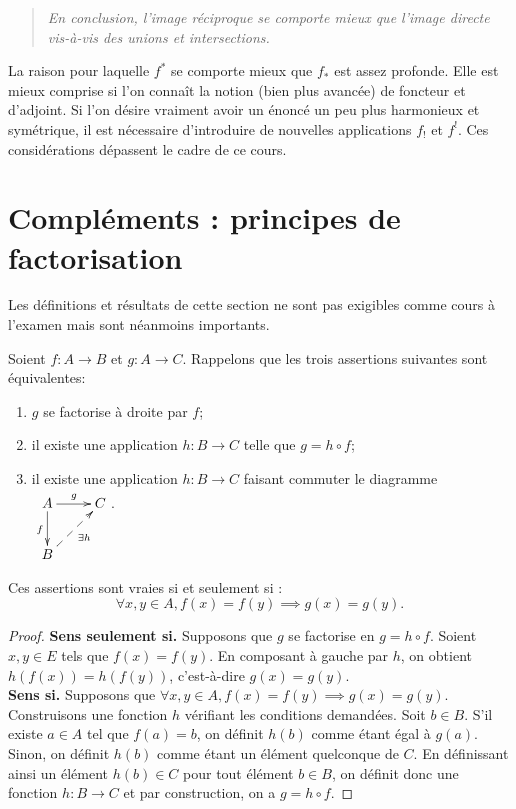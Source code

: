 \begin{quote}
\emph{En conclusion, l'image réciproque se comporte mieux que l'image directe vis-à-vis des unions et intersections.}
\end{quote}

\begin{remarque}
La raison pour laquelle $f^*$ se comporte mieux que $f_*$ est assez profonde. Elle est mieux comprise si l'on connaît la notion (bien plus avancée) de foncteur et d'adjoint.
Si l'on désire vraiment avoir un énoncé un peu plus harmonieux et symétrique, il est nécessaire d'introduire de nouvelles applications $f_!$ et $f^!$. Ces considérations dépassent le cadre de ce cours.
\end{remarque}



\section{Compléments : principes de factorisation}

Les définitions et résultats de cette section ne sont pas exigibles comme cours à l'examen mais sont néanmoins importants.

\begin{proposition}
\label{prop-CNS-factorisation-droite}
Soient $f : A\to B$ et $g : A\to C$. Rappelons que les trois assertions suivantes sont équivalentes:
\begin{enumerate}
\item  $g$ se factorise à droite par $f$;
\item il existe une application $h : B\to C$ telle que $g = h\circ f$;
\item il existe une application $h : B\to C$ faisant commuter  le diagramme  
$\xymatrix{
A \ar[r]^g \ar[d]_{f}& C\\
B \ar@{-->}[ur]_{\exists h}& 
}$.
\end{enumerate}
Ces assertions sont vraies si et seulement si :
\[\forall x, y \in A, f(x)=f(y) \implies g(x)=g(y).\]
\end{proposition}
\begin{proof}
\textbf{Sens \og seulement si\fg.} Supposons que $g$ se factorise en $g = h\circ f$. Soient $x, y\in E$ tels que $f(x)=f(y)$. En composant à gauche par $h$, on obtient $h(f(x)) = h(f(y))$, c'est-à-dire $g(x)=g(y)$.\\
\textbf{Sens \og si\fg.} Supposons que $\forall x, y \in A, f(x)=f(y) \implies g(x)=g(y)$. Construisons une fonction $h$ vérifiant les conditions demandées. Soit $b\in B$. S'il existe $a\in A$ tel que $f(a)=b$, on définit $h(b)$ comme étant égal à $g(a)$. Sinon, on définit $h(b)$ comme étant un élément quelconque de $C$. En définissant ainsi un élément $h(b)\in C$ pour tout élément $b\in B$, on définit donc une fonction $h : B\to C$ et par construction, on a $g = h\circ f$.
\end{proof}

